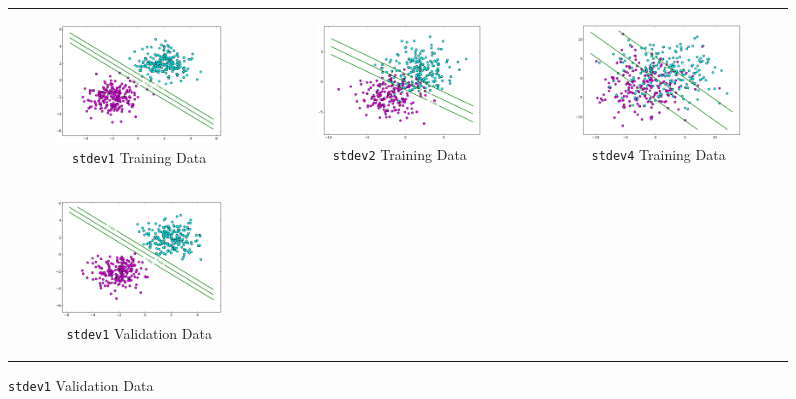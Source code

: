 \documentclass{sigchi}
\begin{document}
\begin{figure}[!ht]
\centering
\begin{tabular}{c c c}
\begin{subfigure}[b]{2.25in}
	\includegraphics[width=2.25in]{plots/1-2/stdev1train.png}
	\caption{\texttt{stdev1} Training Data}
\end{subfigure} &

\begin{subfigure}[b]{2.25in}
	\includegraphics[width=2.25in]{plots/1-2/stdev2train.png}
	\caption{\texttt{stdev2} Training Data}
\end{subfigure} &

\begin{subfigure}[b]{2.25in}
	\includegraphics[width=2.25in]{plots/1-2/stdev4train.png}
	\caption{\texttt{stdev4} Training Data}
\end{subfigure} \\

\begin{subfigure}[b]{2.25in}
	\includegraphics[width=2.25in]{plots/1-2/stdev1valid.png}
	\caption{\texttt{stdev1} Validation Data}
\end{subfigure} &


\end{tabular}
\end{figure}
\end{document}
